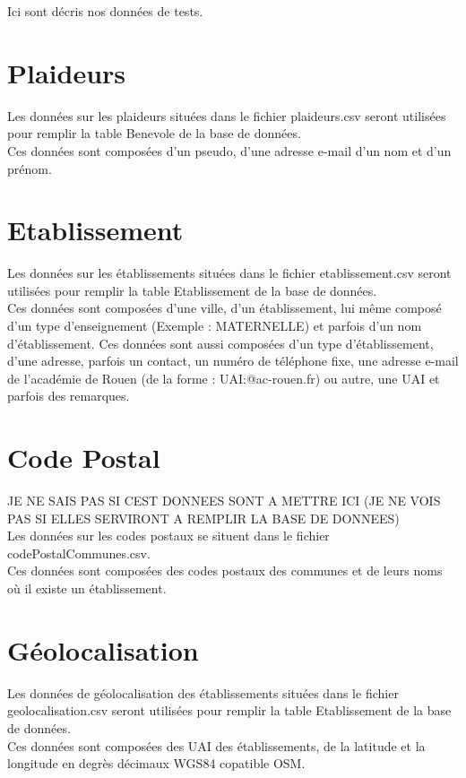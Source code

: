 Ici sont décris nos données de tests.

\section{Plaideurs}
	Les données sur les plaideurs situées dans le fichier plaideurs.csv seront utilisées pour remplir la table Benevole de la base de données. \\
	
	Ces données sont composées d'un pseudo, d'une adresse e-mail d'un nom et d'un prénom.	
\section{Etablissement}
	Les données sur les établissements situées dans le fichier etablissement.csv seront utilisées pour remplir la table Etablissement de la base de données. \\
	
	Ces données sont composées d'une ville, d'un établissement, lui même composé d'un type d'enseignement (Exemple : MATERNELLE) et parfois d'un nom d'établissement. Ces données sont aussi composées d'un type d'établissement, d'une adresse, parfois un contact, un numéro de téléphone fixe, une adresse e-mail de l'académie de Rouen (de la forme : UAI:@ac-rouen.fr) ou autre, une UAI et parfois des remarques.
	
\section{Code Postal}
	JE NE SAIS PAS SI CEST DONNEES SONT A METTRE ICI (JE NE VOIS PAS SI ELLES SERVIRONT A REMPLIR LA BASE DE DONNEES) \\
	
	Les données sur les codes postaux se situent dans le fichier codePostalCommunes.csv. \\
	
	Ces données sont composées des codes postaux des communes et de leurs noms où il existe un établissement.
	
\section{Géolocalisation}
	Les données de géolocalisation des établissements situées dans le fichier geolocalisation.csv seront utilisées pour remplir la table Etablissement de la base de données. \\
	
	Ces données sont composées des UAI des établissements, de la latitude et la longitude en degrès décimaux WGS84 copatible OSM.
	
